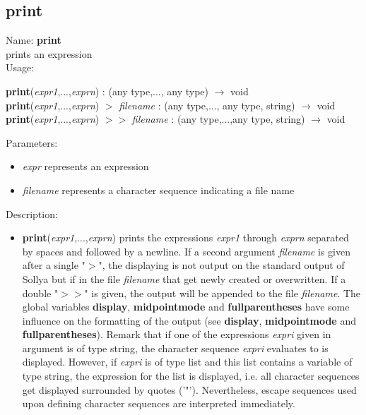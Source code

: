 \subsection{ print }
\noindent Name: \textbf{print}\\
prints an expression\\

\noindent Usage: 
\begin{center}
\textbf{print}(\emph{expr1},...,\emph{exprn}) : (\textsf{any type},..., \textsf{any type}) $\rightarrow$ \textsf{void}\\
\textbf{print}(\emph{expr1},...,\emph{exprn}) $>$ \emph{filename} : (\textsf{any type},..., \textsf{any type}, \textsf{string}) $\rightarrow$ \textsf{void}\\
\textbf{print}(\emph{expr1},...,\emph{exprn}) $>>$ \emph{filename} : (\textsf{any type},...,\textsf{any type}, \textsf{string}) $\rightarrow$ \textsf{void}\\
\end{center}
Parameters: 
\begin{itemize}
\item \emph{expr} represents an expression
\item \emph{filename} represents a character sequence indicating a file name
\end{itemize}
\noindent Description: \begin{itemize}

\item \textbf{print}(\emph{expr1},...,\emph{exprn}) prints the expressions \emph{expr1} through
   \emph{exprn} separated by spaces and followed by a newline.
   If a second argument \emph{filename} is given after a single  "$>$", the
   displaying is not output on the standard output of Sollya but if in
   the file \emph{filename} that get newly created or overwritten. If a double
    "$>>$" is given, the output will be appended to the file \emph{filename}.
   The global variables \textbf{display}, \textbf{midpointmode} and \textbf{fullparentheses} have
   some influence on the formatting of the output (see \textbf{display},
   \textbf{midpointmode} and \textbf{fullparentheses}).
   Remark that if one of the expressions \emph{expri} given in argument is of
   type \textsf{string}, the character sequence \emph{expri} evaluates to is
   displayed. However, if \emph{expri} is of type \textsf{list} and this list
   contains a variable of type \textsf{string}, the expression for the list
   is displayed, i.e.  all character sequences get displayed surrounded
   by quotes ('"'). Nevertheless, escape sequences used upon defining
   character sequences are interpreted immediately.
\end{itemize}
